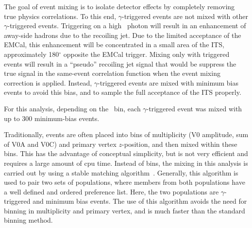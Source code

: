  
 The goal of event mixing is to isolate detector effects by completely removing true physics correlations. To this end, $\gamma$-triggered events are not mixed with other $\gamma$-triggered events. Triggering on a high \pt~photon will result in an enhancement of away-side hadrons due to the recoiling jet. Due to the limited acceptance of the EMCal, this enhancement will be concentrated in a small area of the ITS, approximately 180$^{\circ}$ opposite the EMCal trigger. Mixing only with triggered events will result in a ``pseudo'' recoiling jet signal that would be suppress the true signal in the same-event correlation function when the event mixing correction is applied. Instead, $\gamma$-triggered events are mixed with minimum bias events to avoid this bias, and to sample the full acceptance of the ITS properly.
 
 

 

For this analysis, depending on the \zt~bin, each \(\gamma\)-triggered event was mixed with up to 300 minimum-bias events.

 Traditionally, events are often placed into bins of multiplicity (V0 amplitude, sum of V0A and V0C) and primary vertex $z$-position, and then mixed within these bins. This has the advantage of conceptual simplicity, but is not very efficient and requires a large amount of cpu time. Instead of bins, the mixing in this analysis is carried out by using a stable matching algorithm~\cite{GALE1985223}. Generally, this algorithm is used to pair two sets of populations, where members from both populations have a well defined and ordered preference list. Here, the two populations are $\gamma$-triggered and minimum bias events. The use of this algorithm avoids the need for binning in multiplicity and primary vertex, and is much faster than the standard binning method.
 
